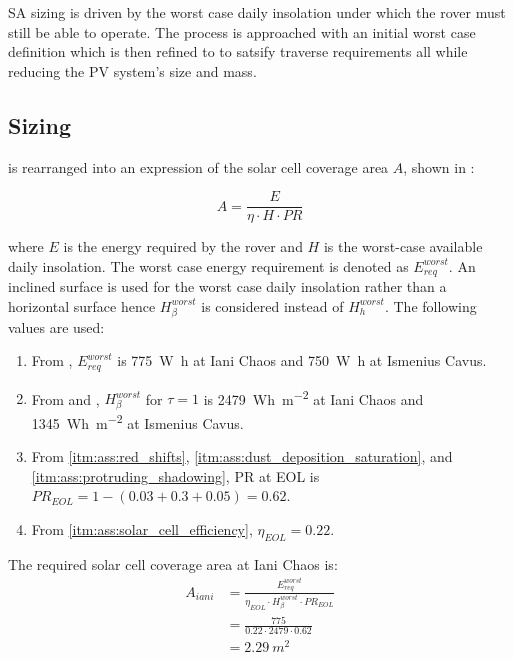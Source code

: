 \ac{SA} sizing is driven by the worst case daily insolation under which the rover must still be able to operate. The process is approached with an initial worst case definition which is then refined to to satsify traverse requirements all while reducing the \ac{PV} system's size and mass.

\subsection{Sizing}
 is rearranged into an expression of the solar cell coverage area $A$, shown in :

\begin{equation}
  \label{eq:solar_cell_coverage_area}
  A = \frac{E}{\eta \cdot H \cdot PR}
\end{equation}

where $E$ is the energy required by the rover and $H$ is the worst-case available daily insolation. The worst case energy requirement is denoted as $E_{req}^{worst}$. An inclined surface is used for the worst case daily insolation rather than a horizontal surface hence $H_{\beta}^{worst}$ is considered instead of $H_{h}^{worst}$. The following values are used:

\begin{enumerate}[label=\textcolor{BulletBlue}{(\alph*)}]
    \item From , $E_{req}^{worst}$ is \SI{775}{\watt\hour} at Iani Chaos and \SI{750}{\watt\hour} at Ismenius Cavus.
    \item From  and , $H_{\beta}^{worst}$ for $\tau=1$ is \SI{2479}{Wh.m^{-2}} at Iani Chaos and \SI{1345}{Wh.m^{-2}} at Ismenius Cavus.
    \item From \ref{itm:ass:red_shifts}, \ref{itm:ass:dust_deposition_saturation}, and \ref{itm:ass:protruding_shadowing}, \ac{PR} at \ac{EOL} is $PR_{EOL} = 1 - (0.03 + 0.3 + 0.05) = 0.62$.
    \item From \ref{itm:ass:solar_cell_efficiency}, $\eta_{EOL} = 0.22$.
\end{enumerate}


The required solar cell coverage area at Iani Chaos is:
\begin{align}
  \label{calc:solar_cell_area_iani_chaos_traverse}
  A_{iani} &= \frac{E_{req}^{worst}}{\eta_{EOL} \cdot H_{\beta}^{worst} \cdot PR_{EOL}}\\
           &= \frac{775}{0.22 \cdot 2479 \cdot 0.62}\\
           &= \SI{2.29}{m^{2}}
\end{align}


